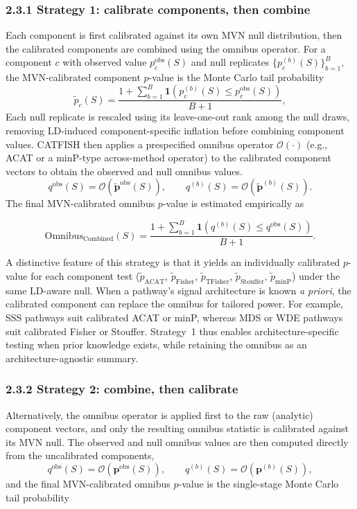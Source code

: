 \documentclass[unnumsec,webpdf,contemporary,large]{oup-authoring-template}%
\theoremstyle{thmstyleone}%
\theoremstyle{thmstyletwo}%
\theoremstyle{thmstylethree}%
\begin{document}
\subsubsection*{2.3.1 Strategy 1: calibrate components, then combine}
Each component is first calibrated against its own MVN null distribution, then the calibrated components are combined using the omnibus operator. For a
component $c$ with observed value $p_c^{\mathrm{obs}}(S)$ and null replicates
$\{p_c^{(b)}(S)\}_{b=1}^{B}$, the MVN-calibrated component $p$-value is the Monte Carlo
tail probability
\[
\tilde p_c(S)
=
\frac{
1+\sum_{b=1}^{B}\mathbf{1}\!\left(
p_c^{(b)}(S)\le p_c^{\mathrm{obs}}(S)
\right)
}{
B+1
},
\]
Each null replicate is rescaled using its leave-one-out rank among the null draws, removing LD-induced component-specific inflation before combining component values. CATFISH then applies a prespecified omnibus operator $\mathcal{O}(\cdot)$ (e.g., ACAT or a minP-type across-method operator) to the calibrated component vectors to obtain the observed and null omnibus values.
\[
q^{\mathrm{obs}}(S)
=
\mathcal{O}\!\left(\tilde{\mathbf{p}}^{\mathrm{obs}}(S)\right),
\qquad
q^{(b)}(S)
=
\mathcal{O}\!\left(\tilde{\mathbf{p}}^{(b)}(S)\right).
\]
The final MVN-calibrated omnibus $p$-value is estimated empirically as

\[
\mathrm{Omnibus}_{\mathrm{Combined}}(S)
=
\frac{
1+\sum_{b=1}^{B}\mathbf{1}\!\left(
q^{(b)}(S)\le q^{\mathrm{obs}}(S)
\right)
}{
B+1
}.
\]



A distinctive feature of this strategy is that it yields an individually calibrated
$p$-value for each component test ($\tilde p_{\mathrm{ACAT}}$,
$\tilde p_{\mathrm{Fisher}}$, $\tilde p_{\mathrm{TFisher}}$,
$\tilde p_{\mathrm{Stouffer}}$, $\tilde p_{\mathrm{minP}}$) under the same LD-aware null. When a pathway's signal architecture is known \emph{a priori}, the calibrated component can replace the omnibus for tailored power. For example,  SSS pathways suit calibrated ACAT or minP, whereas MDS or WDE pathways suit calibrated Fisher or Stouffer. Strategy~1 thus enables architecture-specific testing when prior knowledge exists, while retaining the omnibus as an architecture-agnostic summary.

\subsubsection*{2.3.2 Strategy 2: combine, then calibrate}
Alternatively, the omnibus operator is applied first to the raw (analytic) component vectors, and only the resulting omnibus statistic is calibrated against its MVN null. The observed and null omnibus values are then computed directly from the uncalibrated components,
\[
q^{\mathrm{obs}}(S)
=
\mathcal{O}\!\left(\mathbf{p}^{\mathrm{obs}}(S)\right),
\qquad
q^{(b)}(S)
=
\mathcal{O}\!\left(\mathbf{p}^{(b)}(S)\right),
\]
and the final MVN-calibrated omnibus $p$-value is the single-stage Monte Carlo tail
probability
\end{document}
